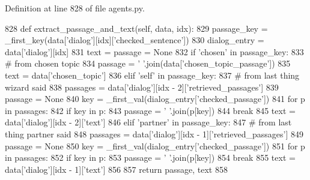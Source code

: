 Definition at line 828 of file agents.\+py.


\begin{DoxyCode}
828     \textcolor{keyword}{def }extract\_passage\_and\_text(self, data, idx):
829         passage\_key = \_first\_key(data[\textcolor{stringliteral}{'dialog'}][idx][\textcolor{stringliteral}{'checked\_sentence'}])
830         dialog\_entry = data[\textcolor{stringliteral}{'dialog'}][idx]
831         text = passage = \textcolor{keywordtype}{None}
832         \textcolor{keywordflow}{if} \textcolor{stringliteral}{'chosen'} \textcolor{keywordflow}{in} passage\_key:
833             \textcolor{comment}{# from chosen topic}
834             passage = \textcolor{stringliteral}{' '}.join(data[\textcolor{stringliteral}{'chosen\_topic\_passage'}])
835             text = data[\textcolor{stringliteral}{'chosen\_topic'}]
836         \textcolor{keywordflow}{elif} \textcolor{stringliteral}{'self'} \textcolor{keywordflow}{in} passage\_key:
837             \textcolor{comment}{# from last thing wizard said}
838             passages = data[\textcolor{stringliteral}{'dialog'}][idx - 2][\textcolor{stringliteral}{'retrieved\_passages'}]
839             passage = \textcolor{keywordtype}{None}
840             key = \_first\_val(dialog\_entry[\textcolor{stringliteral}{'checked\_passage'}])
841             \textcolor{keywordflow}{for} p \textcolor{keywordflow}{in} passages:
842                 \textcolor{keywordflow}{if} key \textcolor{keywordflow}{in} p:
843                     passage = \textcolor{stringliteral}{' '}.join(p[key])
844                     \textcolor{keywordflow}{break}
845             text = data[\textcolor{stringliteral}{'dialog'}][idx - 2][\textcolor{stringliteral}{'text'}]
846         \textcolor{keywordflow}{elif} \textcolor{stringliteral}{'partner'} \textcolor{keywordflow}{in} passage\_key:
847             \textcolor{comment}{# from last thing partner said}
848             passages = data[\textcolor{stringliteral}{'dialog'}][idx - 1][\textcolor{stringliteral}{'retrieved\_passages'}]
849             passage = \textcolor{keywordtype}{None}
850             key = \_first\_val(dialog\_entry[\textcolor{stringliteral}{'checked\_passage'}])
851             \textcolor{keywordflow}{for} p \textcolor{keywordflow}{in} passages:
852                 \textcolor{keywordflow}{if} key \textcolor{keywordflow}{in} p:
853                     passage = \textcolor{stringliteral}{' '}.join(p[key])
854                     \textcolor{keywordflow}{break}
855             text = data[\textcolor{stringliteral}{'dialog'}][idx - 1][\textcolor{stringliteral}{'text'}]
856 
857         \textcolor{keywordflow}{return} passage, text
858 
\end{DoxyCode}
